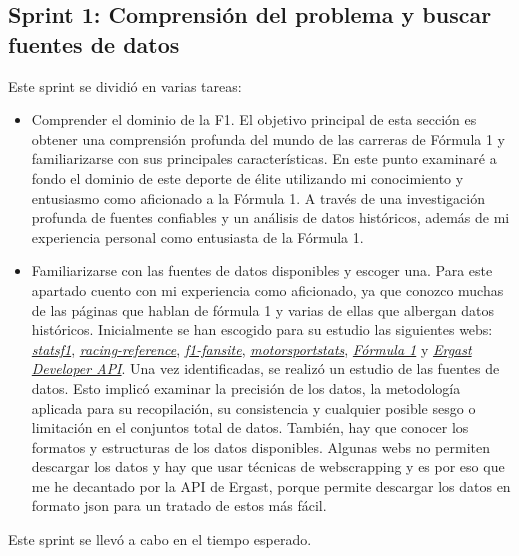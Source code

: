 \subsection{Sprint 1: Comprensión del problema y buscar fuentes de datos} 
Este sprint se dividió en varias tareas:
\begin{itemize}
    \item
    Comprender el dominio de la F1.
    El objetivo principal de esta sección es obtener una comprensión profunda del mundo de las carreras de Fórmula 1 y familiarizarse con sus principales características. En este punto examinaré a fondo el dominio de este deporte de élite utilizando mi conocimiento y entusiasmo como aficionado a la Fórmula 1.
    A través de una investigación profunda de fuentes confiables y un análisis de datos históricos, además de mi experiencia personal como entusiasta de la Fórmula 1.
    \item
    Familiarizarse con las fuentes de datos disponibles y escoger una.
    Para este apartado cuento con mi experiencia como aficionado, ya que conozco muchas de las páginas que hablan de fórmula 1 y varias de ellas que albergan datos históricos. Inicialmente se han escogido para su estudio las siguientes webs: \href{https://www.statsf1.com/}{\textit{statsf1}}, \href{https://www.racing-reference.info/}{\textit{racing-reference}}, \href{https://www.f1-fansite.com/}{\textit{f1-fansite}},  \href{https://www.motorsportstats.com/}{\textit{motorsportstats}}, \href{https://www.formula1.com/}{\textit{Fórmula 1}} y \href{https://ergast.com/mrd/}{\textit{Ergast Developer API}}. 
    Una vez identificadas, se realizó un estudio de las fuentes de datos. Esto implicó examinar la precisión de los datos, la metodología aplicada para su recopilación, su consistencia y cualquier posible sesgo o limitación en el conjuntos total de datos. También, hay que conocer los formatos y estructuras de los datos disponibles. Algunas webs no permiten descargar los datos y hay que usar técnicas de webscrapping y es por eso que me he decantado por la API de Ergast, porque permite descargar los datos en formato json para un tratado de estos más fácil.
\end{itemize}

Este sprint se llevó a cabo en el tiempo esperado.

